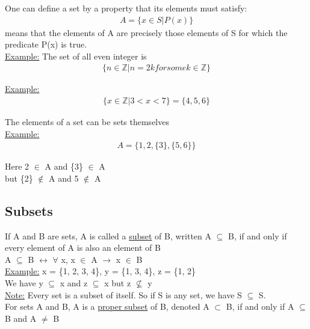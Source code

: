 \documentclass{article}
\begin{document}
One can define a set by a property that its elements must satisfy:
\begin{align}
A = \{x \in S | P(x)\}
\end{align}
means that the elements of A are precisely those elements of S for which the predicate P(x) is true. \\

\underline{Example:} The set of all even integer is 
\begin{align}
\{n \in \mathbb{Z} | n = 2k for some k \in \mathbb{Z}\}
\end{align}

\underline{Example:}
\begin{align}
\{x \in \mathbb{Z} | 3 < x < 7\} = \{4, 5, 6\}
\end{align}

The elements of a set can be sets themselves \\ 
\underline{Example: }
\begin{align}
A=\{1, 2, \{3\}, \{5,6\}\}
\end{align}

Here 2 $\in$ A and \{3\} $\in$ A \\
but \{2\} $\notin$ A and 5 $\notin$ A \\

\subsection{Subsets}

If A and B are sets, A is called a \underline{subset} of B, written A $\subseteq$ B, if and only if every element of A is also an
element of B \\

A $\subseteq$ B $\leftrightarrow$ $\forall$ x, x $\in$ A $\rightarrow$ x $\in$ B \\

\underline{Example:} x = \{1, 2, 3, 4\}, y = \{1, 3, 4\}, z = \{1, 2\} \\

We have y $\subseteq$ x and z $\subseteq$ x but z $\nsubseteq$ y \\

\underline{Note:} Every set is a subset of itself. So if S is any set, we have S $\subseteq$ S. \\

For sets A and B, A is a \underline{proper subset} of B, denoted A $\subset$ B, if and only if A $\subseteq$ B and A $\neq$ B \\
\end{document}
